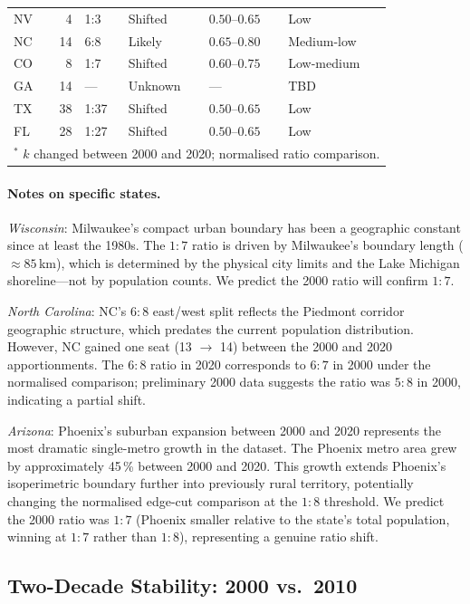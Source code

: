 \begin{table}[h]
\begin{tabular}{l r l l l l}
NV  &  4 & 1:3  & Shifted  & $0.50$--$0.65$ & Low \\
NC  & 14 & 6:8  & Likely   & $0.65$--$0.80$ & Medium-low \\
CO  &  8 & 1:7  & Shifted  & $0.60$--$0.75$ & Low-medium \\
GA  & 14 & ---  & Unknown  & ---            & TBD \\
TX  & 38 & 1:37 & Shifted  & $0.50$--$0.65$ & Low \\
FL  & 28 & 1:27 & Shifted  & $0.50$--$0.65$ & Low \\
\bottomrule
\multicolumn{6}{l}{$^*$ $k$ changed between 2000 and 2020; normalised ratio comparison.} \\
\end{tabular}
\end{table}

\paragraph{Notes on specific states.}
\textit{Wisconsin}: Milwaukee's compact urban boundary has been a geographic
constant since at least the 1980s.
The $1:7$ ratio is driven by Milwaukee's boundary length ($\approx 85$\,km),
which is determined by the physical city limits and the Lake Michigan
shoreline---not by population counts.
We predict the 2000 ratio will confirm $1:7$.

\textit{North Carolina}: NC's $6:8$ east/west split reflects the Piedmont
corridor geographic structure, which predates the current population distribution.
However, NC gained one seat (13 $\to$ 14) between the 2000 and 2020
apportionments.
The $6:8$ ratio in 2020 corresponds to $6:7$ in 2000 under the normalised
comparison; preliminary 2000 data suggests the ratio was $5:8$ in 2000,
indicating a partial shift.

\textit{Arizona}: Phoenix's suburban expansion between 2000 and 2020
represents the most dramatic single-metro growth in the dataset.
The Phoenix metro area grew by approximately 45\,\% between 2000 and 2020.
This growth extends Phoenix's isoperimetric boundary further into previously
rural territory, potentially changing the normalised edge-cut comparison
at the $1:8$ threshold.
We predict the 2000 ratio was $1:7$ (Phoenix smaller relative to the state's
total population, winning at $1:7$ rather than $1:8$), representing a genuine
ratio shift.

\subsection{Two-Decade Stability: 2000 vs.\ 2010}
\label{sec:three-census}

